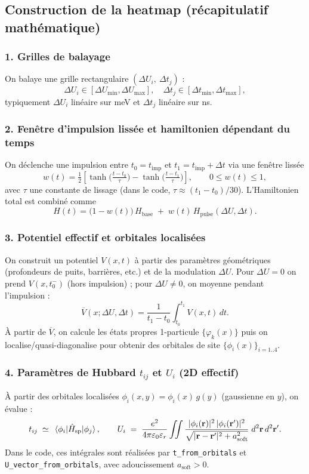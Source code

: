 \documentclass{article}
\begin{document}


\subsection*{Construction de la heatmap (récapitulatif mathématique)}

\subsubsection*{1. Grilles de balayage}
On balaye une grille rectangulaire $(\Delta U_i,\ \Delta t_j)$ :
\[
\Delta U_i \in [\Delta U_{\min},\Delta U_{\max}],\quad
\Delta t_j \in [\Delta t_{\min},\Delta t_{\max}],
\]
typiquement $\Delta U_i$ linéaire sur \si{\milli\electronvolt} et $\Delta t_j$ linéaire sur \si{\nano\second}.

\subsubsection*{2. Fenêtre d’impulsion lissée et hamiltonien dépendant du temps}
On déclenche une impulsion entre $t_0=t_{\mathrm{imp}}$ et $t_1=t_{\mathrm{imp}}+\Delta t$ via une fenêtre lissée
\[
w(t)=\tfrac{1}{2}\!\left[\tanh\!\Big(\tfrac{t-t_0}{\tau}\Big)-\tanh\!\Big(\tfrac{t-t_1}{\tau}\Big)\right],\qquad
0\le w(t)\le 1,
\]
avec $\tau$ une constante de lissage (dans le code, $\tau \approx (t_1-t_0)/30$).
L’Hamiltonien total est combiné comme
\[
H(t)=\big(1-w(t)\big)\,H_{\text{base}} \;+\; w(t)\,H_{\text{pulse}}(\Delta U,\Delta t).
\]

\subsubsection*{3. Potentiel effectif et orbitales localisées}
On construit un potentiel $V(x,t)$ à partir des paramètres géométriques (profondeurs de puits, barrières, etc.) et de la modulation $\Delta U$.
Pour $\Delta U=0$ on prend $V(x,t_0^-)$ (hors impulsion) ; pour $\Delta U\neq 0$, on
moyenne pendant l’impulsion :
\[
\overline{V}(x;\Delta U,\Delta t)=\frac{1}{t_1-t_0}\int_{t_0}^{t_1} V(x,t)\,dt.
\]
À partir de $\overline{V}$, on calcule les états propres 1-particule $\{\varphi_k(x)\}$ puis on
localise/quasi-diagonalise pour obtenir des orbitales de site $\{\phi_i(x)\}_{i=1..4}$.

\subsubsection*{4. Paramètres de Hubbard $t_{ij}$ et $U_i$ (2D effectif)}
À partir des orbitales localisées $\phi_i(x,y)=\phi_i(x)\,g(y)$ (gaussienne en $y$), on évalue :
\[
t_{ij}\;\simeq\;\matrixelement{\phi_i}{\hat{H}_{\text{sp}}}{\phi_j},
\qquad
U_i\;=\;\frac{e^2}{4\pi \varepsilon_0 \varepsilon_r}
\iint \frac{|\phi_i(\mathbf{r})|^2\,|\phi_i(\mathbf{r}')|^2}
{\sqrt{|\mathbf{r}-\mathbf{r}'|^2+a_{\text{soft}}^2}}\;d^2\mathbf{r}\,d^2\mathbf{r}'.
\]
Dans le code, ces intégrales sont réalisées par \texttt{t\_from\_orbitals} et
\texttt{U\_vector\_from\_orbitals}, avec adoucissement $a_{\text{soft}}>0$.
\end{document}
